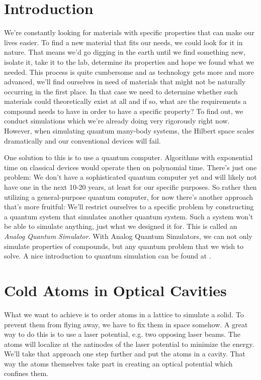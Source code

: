 \section{Introduction}
We're constantly looking for materials with specific properties that can make our lives easier. To find a new material that fits our needs, we could look for it in nature. That means we'd go digging in the earth until we find something new, isolate it, take it to the lab, determine its properties and hope we found what we needed. This process is quite cumbersome and as technology gets more and more advanced, we'll find ourselves in need of materials that might not be naturally occurring in the first place. In that case we need to determine whether such materials could theoretically exist at all and if so, what are the requirements a compound needs to have in order to have a specific property? To find out, we conduct simulations which we're already doing very rigorously right now. However, when simulating quantum many-body systems, the Hilbert space scales dramatically and our conventional devices will fail.

One solution to this is to use a quantum computer. Algorithms with exponential time on classical devices would operate then on polynomial time. There's just one problem: We don't have a sophisticated quantum computer yet and will likely not have one in the next 10-20 years, at least for our specific purposes. So rather then utilizing a general-purpose quantum computer, for now there's another approach that's more fruitful: We'll restrict ourselves to a specific problem by constructing a quantum system that simulates another quantum system. Such a system won't be able to simulate anything, just what we designed it for. This is called an \textit{Analog Quantum Simulator}. With Analog Quantum Simulators, we can not only simulate properties of compounds, but any quantum problem that we wish to solve. A nice introduction to quantum simulation can be found at \cite{quantum_sanchez}.

\section{Cold Atoms in Optical Cavities}
What we want to achieve is to order atoms in a lattice to simulate a solid. To prevent them from flying away, we have to fix them in space somehow. A great way to do this is to use a laser potential, e.g. two opposing laser beams. The atoms will localize at the antinodes of the laser potential to minimize the energy. We'll take that approach one step further and put the atoms in a cavity. That way the atoms themselves take part in creating an optical potential which confines them.

